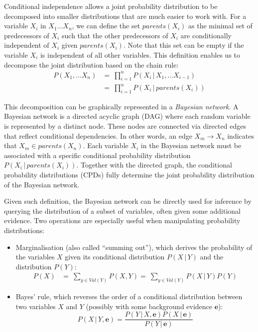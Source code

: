 Conditional independence allows a joint probability distribution to be decomposed into smaller distributions that are much easier to work with.  For a variable $X_i$ in $ X_1...X_n$, we can define the set $parents(X_i)$ as the minimal set of predecessors of $X_i$ such that the other predecessors of $X_i$ are conditionally independent of $X_i$ given $parents(X_i)$.  Note that this set can be empty if the variable $X_i$ is independent of all other variables. This definition enables us to decompose the joint distribution based on the chain rule:
\begin{align}
P(X_1,...X_n) & = \ \prod_{i=1}^n P(X_i  \, | \,  X_1, ... X_{i-1}) \\
&= \ \prod_{i=1}^n P(X_i  \, | \,  parents(X_i)) 
\end{align}

This decomposition can be graphically represented in a \textit{Bayesian network}.  A Bayesian network is a directed acyclic graph (DAG) where each random variable is represented by a distinct node.  These nodes are connected via directed edges that reflect conditional dependencies. In other words, an edge $X_m \rightarrow X_n$ indicates that $X_m \in parents(X_n)$. Each variable $X_i$ in the Bayesian network must be associated with a specific conditional probability distribution $P(X_i  \, | \,  parents(X_i))$.   Together with the directed graph, the conditional probability distributions (CPDs) fully determine the joint probability distribution of the Bayesian network.   

Given such definition, the Bayesian network can be directly used for inference by querying the distribution of a subset of variables, often given some additional evidence. Two operations are especially useful when manipulating probability distributions: 
\begin{itemize}
\item Marginalisation (also called ``summing out''), which derives the probability of the variables $X$ given its conditional distribution $P(X \, | \, Y)$ and the distribution $P(Y)$: 
\begin{align}
P(X) & = \ \sum_{y \in Val(Y)} P(X,Y) = \ \sum_{y \in Val(Y)} P(X \, | \, Y) P(Y)
\end{align}
\item Bayes' rule, which reverses the order of a conditional distribution between two variables $X$ and $Y$ (possibly with some background evidence $\mathbf{e}$): 
\begin{equation}
P(X \, | \, Y, \mathbf{e}) = \frac{P(Y \, | \, X, \mathbf{e}) P(X \, | \, \mathbf{e})} {P(Y \, | \, \mathbf{e})} \label{eq:genbayes}
\end{equation}
\end{itemize}

